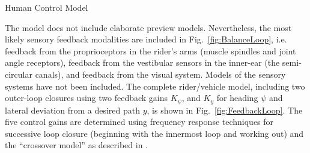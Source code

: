 \documentclass[final]{beamer}
\newlength{\onecolwid}
\begin{document}
{\begin{center}
\begin{columns}[t]
\begin{column}{\onecolwid}
\begin{block}{Human Control Model}
{    \begin{figure}[h]
      \begin{center}
        \quad
        \caption{}
      \end{center}
      \label{fig:Loops}
    \end{figure}
    The model does not include elaborate preview models. Nevertheless, the most
    likely sensory feedback modalities are included in
    Fig.~\ref{fig:BalanceLoop}, i.e. feedback from the proprioceptors in the
    rider's arms (muscle spindles and joint angle receptors), feedback from the
    vestibular sensors in the inner-ear (the semi-circular canals), and
    feedback from the visual system. Models of the sensory systems have not
    been included. The complete rider/vehicle model, including two outer-loop
    closures using two feedback gains $K_\psi$, and $K_y$ for heading $\psi$
    and lateral deviation from a desired path $y$, is shown in
    Fig.~\ref{fig:FeedbackLoop}.  The five control gains are determined using
    frequency response techniques for successive loop closure (beginning with
    the innermost loop and working out) and the ``crossover model'' as
    described in \cite{Hess1990}.

}
\end{block}
\end{column}
\end{columns}
\end{center}}
\end{document}

